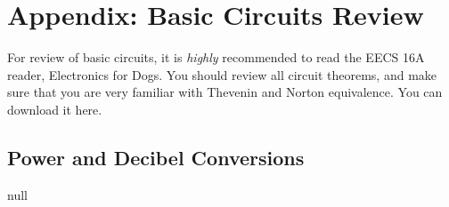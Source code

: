 \chapter{Appendix: Basic Circuits Review}
\label{app:circuits}
For review of basic circuits, it is \emph{highly} recommended to read the EECS 16A reader, Electronics for Dogs.  You should review all circuit theorems, and make sure that you are very familiar with Thevenin and Norton equivalence.  You can download it here.
\section{Power and Decibel Conversions}
\label{sec:power_decibel}
null
